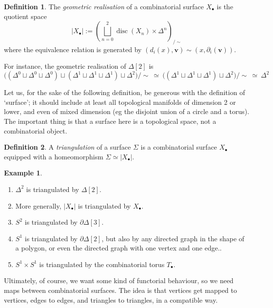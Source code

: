 \documentclass{tufte-handout}
\newcommand{\lecturenum}[1]{\marginnote{\color{red}Lecture #1}}
\DeclareMathOperator{\disc}{disc}
\theoremstyle{definition}
\newtheorem{definition}{Definition}
\newtheorem{example}{Example}
\begin{document}
\begin{definition}
The \emph{geometric realisation} of a combinatorial surface $X_\bullet$ is the quotient space
\[
|X_\bullet| := \left(\bigsqcup_{n=0}^2 \disc(X_n) \times \Delta^n\right)_{\big/\!\sim}
\]
where the equivalence relation is generated by 
$(d_i(x),\mathbf{v}) \sim (x,\partial_i(\mathbf{v}))$.
\end{definition}

For 
instance, the geometric realisation of $\Delta[2]$ is 
\[
\Big((\Delta^0 \sqcup \Delta^0 \sqcup \Delta^0) \sqcup (\Delta^1 \sqcup 
\Delta^1 \sqcup\Delta^1) \sqcup\Delta^2\Big)/\!\sim\ \simeq\ \Big((\Delta^1 \sqcup 
\Delta^1 \sqcup\Delta^1) \sqcup\Delta^2\Big)/\!\sim\ \simeq\ \Delta^2
\]

Let us, for the sake of the following definition, be generous with the definition of `surface';
it should include at least all topological manifolds of dimension 2 or lower, and even of mixed
dimension (eg the disjoint union of a circle and a torus). The important thing is that a
surface here is a topological space, not a combinatorial object.

\begin{definition}
A \emph{triangulation} of a surface $\Sigma$ is a combinatorial surface $X_\bullet$ equipped
with 
a homeomorphism $\Sigma \simeq |X_\bullet|$.
\end{definition}

\begin{example}
\begin{enumerate}
\item $\Delta^2$ is triangulated by $\Delta[2]$.
\item More generally, $|X_\bullet|$ is triangulated by $X_\bullet$.
\item $S^2$ is triangulated by $\partial\Delta[3]$.
\item $S^1$ is triangulated by $\partial\Delta[2]$, but also by any directed graph in the shape
of a polygon, or even the directed graph with one vertex and one edge..
\item $S^1\times S^1$ is triangulated by the combinatorial torus $T_\bullet$.
\end{enumerate}
\end{example}



Ultimately,\lecturenum{22} of course, we want some kind of functorial behaviour, so we need
maps between combinatorial surfaces. The idea is that vertices get mapped to vertices, edges
to edges, and triangles to triangles, in a compatible way.
\end{document}
